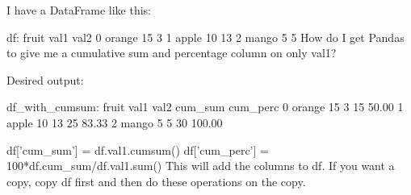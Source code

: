 
I have a DataFrame like this:

df:
 fruit    val1 val2
0 orange    15    3
1 apple     10   13
2 mango     5    5 
 How do I get Pandas to give me a cumulative sum and percentage column on only val1?

Desired output:

df_with_cumsum:
 fruit    val1 val2   cum_sum    cum_perc
0 orange    15    3    15          50.00
1 apple     10   13    25          83.33
2 mango     5    5     30          100.00

df['cum_sum'] = df.val1.cumsum()
df['cum_perc'] = 100*df.cum_sum/df.val1.sum()
This will add the columns to df. If you want a copy, copy df first and then do these operations on the copy.
